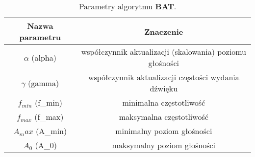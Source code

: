 \begin{table}[H]
  \center
  \begin{tabular}{c|c}
    \hline
    \textbf{Nazwa parametru} & \textbf{Znaczenie} \\ \hline
    $\alpha$ (alpha)    & współczynnik aktualizacji (skalowania) poziomu głośności \\
    $\gamma$ (gamma)    & współczynnik aktualizacji częstości wydania dźwięku\\
    $f_{min}$ (f\_min)  & minimalna częstotliwość\\
    $f_{max}$ (f\_max)  & maksymalna częstotliwość\\
    $A_max$ (A\_min)    & minimalny poziom głośności\\
    $A_0$ (A\_0)        & maksymalny poziom głośności\\
  \end{tabular}
  \caption{Parametry algorytmu \textbf{BAT}.}
\end{table}
